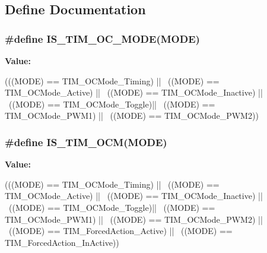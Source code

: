 \subsection{Define Documentation}
\hypertarget{group__TIM__Output__Compare__and__PWM__modes_ga93d898976e236c135bfd02a0c213c8ec}{
\subsubsection[{IS\_\-TIM\_\-OC\_\-MODE}]{\setlength{\rightskip}{0pt plus 5cm}\#define IS\_\-TIM\_\-OC\_\-MODE(MODE)}}
\label{group__TIM__Output__Compare__and__PWM__modes_ga93d898976e236c135bfd02a0c213c8ec}
{\bfseries Value:}
\begin{DoxyCode}
(((MODE) == TIM_OCMode_Timing) || \
                              ((MODE) == TIM_OCMode_Active) || \
                              ((MODE) == TIM_OCMode_Inactive) || \
                              ((MODE) == TIM_OCMode_Toggle)|| \
                              ((MODE) == TIM_OCMode_PWM1) || \
                              ((MODE) == TIM_OCMode_PWM2))
\end{DoxyCode}
\hypertarget{group__TIM__Output__Compare__and__PWM__modes_ga45f530dd241d3b0787b5c2d62cd1b98f}{
\subsubsection[{IS\_\-TIM\_\-OCM}]{\setlength{\rightskip}{0pt plus 5cm}\#define IS\_\-TIM\_\-OCM(MODE)}}
\label{group__TIM__Output__Compare__and__PWM__modes_ga45f530dd241d3b0787b5c2d62cd1b98f}
{\bfseries Value:}
\begin{DoxyCode}
(((MODE) == TIM_OCMode_Timing) || \
                          ((MODE) == TIM_OCMode_Active) || \
                          ((MODE) == TIM_OCMode_Inactive) || \
                          ((MODE) == TIM_OCMode_Toggle)|| \
                          ((MODE) == TIM_OCMode_PWM1) || \
                          ((MODE) == TIM_OCMode_PWM2) ||        \
                          ((MODE) == TIM_ForcedAction_Active) || \
                          ((MODE) == TIM_ForcedAction_InActive))
\end{DoxyCode}
